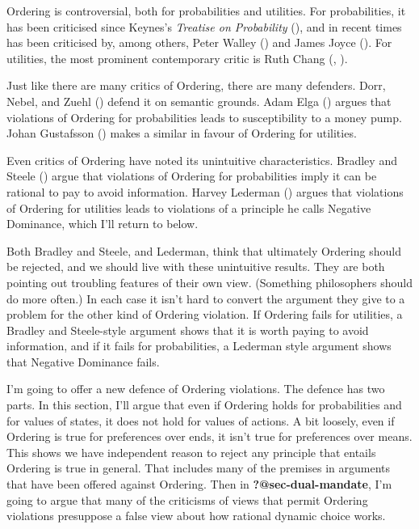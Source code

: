 \documentclass[
  10pt,
  letterpaper,
  DIV=11,
  numbers=noendperiod,
  twoside]{scrartcl}
\begin{document}
Ordering is controversial, both for probabilities and utilities. For
probabilities, it has been criticised since Keynes's \emph{Treatise on
Probability} (), and in recent times has
been criticised by, among others, Peter Walley
() and James Joyce
(). For utilities, the most prominent
contemporary critic is Ruth Chang (,
).

Just like there are many critics of Ordering, there are many defenders.
Dorr, Nebel, and Zuehl () defend it on
semantic grounds. Adam Elga () argues that
violations of Ordering for probabilities leads to susceptibility to a
money pump. Johan Gustafsson () makes
a similar in favour of Ordering for utilities.

Even critics of Ordering have noted its unintuitive characteristics.
Bradley and Steele () argue that
violations of Ordering for probabilities imply it can be rational to pay
to avoid information. Harvey Lederman ()
argues that violations of Ordering for utilities leads to violations of
a principle he calls Negative Dominance, which I'll return to below.

Both Bradley and Steele, and Lederman, think that ultimately Ordering
should be rejected, and we should live with these unintuitive results.
They are both pointing out troubling features of their own view.
(Something philosophers should do more often.) In each case it isn't
hard to convert the argument they give to a problem for the other kind
of Ordering violation. If Ordering fails for utilities, a Bradley and
Steele-style argument shows that it is worth paying to avoid
information, and if it fails for probabilities, a Lederman style
argument shows that Negative Dominance fails.

I'm going to offer a new defence of Ordering violations. The defence has
two parts. In this section, I'll argue that even if Ordering holds for
probabilities and for values of states, it does not hold for values of
actions. A bit loosely, even if Ordering is true for preferences over
ends, it isn't true for preferences over means. This shows we have
independent reason to reject any principle that entails Ordering is true
in general. That includes many of the premises in arguments that have
been offered against Ordering. Then in \textbf{?@sec-dual-mandate}, I'm
going to argue that many of the criticisms of views that permit Ordering
violations presuppose a false view about how rational dynamic choice
works.
\end{document}

